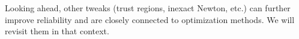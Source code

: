 Looking ahead, other tweaks (trust regions, inexact Newton, etc.) can further improve reliability and are closely connected to optimization methods. We will revisit them in that context.


